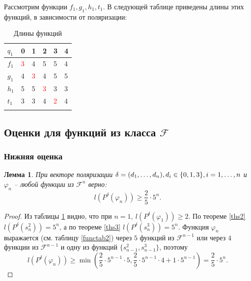 \documentclass[bibliography=totoc, a4paper, 14pt]{extarticle}
\newtheorem{mylm}{Лемма}
\newcommand{\pphi}[1] {P^{\delta}(\varphi_{#1})}
\def\in{\mathchar"3232\nobreak\discretionary{}{\usefont{OMS}{cmsy}{m}{n}\char50}{}}
\begin{document}
Рассмотрим функции $f_1, g_1, h_1, t_1$. В следующей таблице приведены длины этих функций,
в зависимости от поляризации:
\begin{center}
\begin{longtable}{| l | l | l | l | l | l |}

\hline $q_1$ & 0 & 1 & 2 & 3 & 4 \\
\hline

$f_1$ & \textcolor{red}{3} & 4 & 5 & 5 & 4
\\ \hline

$g_1$ & 4 & \textcolor{red}{3} & 4 & 5 & 5
\\ \hline

$h_1$ & 5 & 5 & \textcolor{red}{3} & 3 & 3
\\ \hline

$t_1$ & 3 & 3 & 4 & \textcolor{red}{2} & 4
\\ \hline

\caption{Длины функций}
\label{tab1}
\end{longtable}
\end{center}

\subsection{Оценки для функций из класса $\mathcal{F}$}
\subsubsection{Нижняя оценка}
\begin{mylm}
При векторе поляризации $\delta = (d_1,\dots,d_n), d_i \in \{0,1,3\}, i = 1,\dots,n$ и
$\varphi_n$ -- любой функции из $\mathcal{F}^n$ верно:
$$l(\pphi{n}) \geqslant \frac{2}{5} \cdot 5^n.$$
\end{mylm}
\begin{proof}
Из таблицы \ref{tab1} видно, что при $n=1,\ l(\pphi{1}) \geqslant 2$.
По теореме \ref{ths2} $l(P^{\delta}(s^2_n)) = 5^n$, а по теореме \ref{ths3}
$l(P^{\delta}(s^3_n)) = 5^n$. Функция $\varphi_n$ выражается (см. таблицу \ref{functab2}) через $5$
функций из $\mathcal{F}^{n-1}$ или через $4$ функции из $\mathcal{F}^{n-1}$ и одну из функций
$\{s^2_{n-1}, s^3_{n-1}\}$, поэтому
$${l(\pphi{n})\geqslant\min(\frac{2}{5}\cdot5^{n-1}\cdot5,\frac{2}{5}\cdot5^{n-1}\cdot4+1
    \cdot5^{n-1})} = \frac{2}{5}\cdot5^n.$$
\end{proof}
\end{document}
